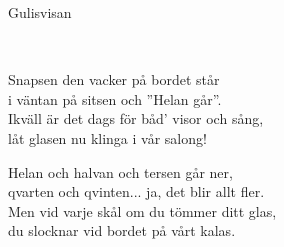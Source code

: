 \begin{song}{Gulisvisan}
	
	\\
	
	Snapsen den vacker på bordet står\\
    i väntan på sitsen och ''Helan går''.\\
    Ikväll är det dags för båd' visor och sång,\\
    låt glasen nu klinga i vår salong!

    Helan och halvan och tersen går ner,\\
    qvarten och qvinten... ja, det blir allt fler.\\
    Men vid varje skål om du tömmer ditt glas,\\
    du slocknar vid bordet på vårt kalas.
	
\end{song}
